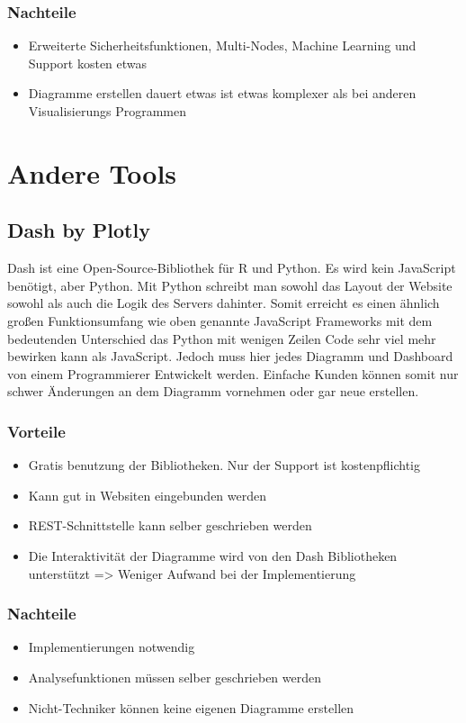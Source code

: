 \subsubsection{Nachteile}
\begin{itemize}
\item Erweiterte Sicherheitsfunktionen, Multi-Nodes, Machine Learning und Support kosten etwas
\item Diagramme erstellen dauert etwas ist etwas komplexer als bei anderen Visualisierungs Programmen
\end{itemize}
\section{Andere Tools}
\subsection{Dash by Plotly}
Dash ist eine Open-Source-Bibliothek für R und Python. Es wird kein JavaScript benötigt, aber Python. Mit Python schreibt man sowohl das Layout der Website sowohl als auch die Logik des Servers dahinter. Somit erreicht es einen ähnlich großen Funktionsumfang wie oben genannte JavaScript Frameworks mit dem bedeutenden Unterschied das Python mit wenigen Zeilen Code sehr viel mehr bewirken kann als JavaScript. Jedoch muss hier jedes Diagramm und Dashboard von einem Programmierer Entwickelt werden. Einfache Kunden können somit nur schwer Änderungen an dem Diagramm vornehmen oder gar neue erstellen.
\subsubsection{Vorteile} 
\begin{itemize}
\item Gratis benutzung der Bibliotheken. Nur der Support ist kostenpflichtig
\item Kann gut in Websiten eingebunden werden
\item REST-Schnittstelle kann selber geschrieben werden
\item Die Interaktivität der Diagramme wird von den Dash Bibliotheken unterstützt => Weniger Aufwand bei der Implementierung
\end{itemize}
\subsubsection{Nachteile}
\begin{itemize}
\item Implementierungen notwendig
\item Analysefunktionen müssen selber geschrieben werden
\item Nicht-Techniker können keine eigenen Diagramme erstellen
\end{itemize}
